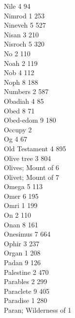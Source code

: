 Nile \hfill 4 \quad \phantom{0}\phantom{0}94\\
Nimrod \hfill 1 \quad \phantom{0}253\\
Nineveh \hfill 5 \quad \phantom{0}527\\
Nisan \hfill 3 \quad \phantom{0}210\\
Nisroch \hfill 5 \quad \phantom{0}320\\
No \hfill 2 \quad \phantom{0}110\\
Noah \hfill 2 \quad \phantom{0}119\\
Nob \hfill 4 \quad \phantom{0}112\\
Noph \hfill 8 \quad \phantom{0}188\\
Numbers \hfill 2 \quad \phantom{0}587\\
Obadiah \hfill 4 \quad \phantom{0}\phantom{0}85\\
Obed \hfill 8 \quad \phantom{0}\phantom{0}71\\
Obed-edom \hfill 9 \quad \phantom{0}180\\
Occupy \hfill 2 \\
Og \hfill 4 \quad \phantom{0}\phantom{0}67\\
Old Testament \hfill 4 \quad \phantom{0}895\\
Olive tree \hfill 3 \quad \phantom{0}804\\
Olives; Mount of \hfill 6 \\
Olivet; Mount of \hfill 7 \\
Omega \hfill 5 \quad \phantom{0}113\\
Omer \hfill 6 \quad \phantom{0}195\\
Omri \hfill 1 \quad \phantom{0}199\\
On \hfill 2 \quad \phantom{0}110\\
Onan \hfill 8 \quad \phantom{0}161\\
Onesimus \hfill 7 \quad \phantom{0}664\\
Ophir \hfill 3 \quad \phantom{0}237\\
Organ \hfill 1 \quad \phantom{0}208\\
Padan \hfill 9 \quad \phantom{0}126\\
Palestine \hfill 2 \quad \phantom{0}470\\
Parables \hfill 2 \quad \phantom{0}299\\
Paraclete \hfill 9 \quad \phantom{0}405\\
Paradise \hfill 1 \quad \phantom{0}280\\
Paran; Wilderness of \hfill 1 \\
